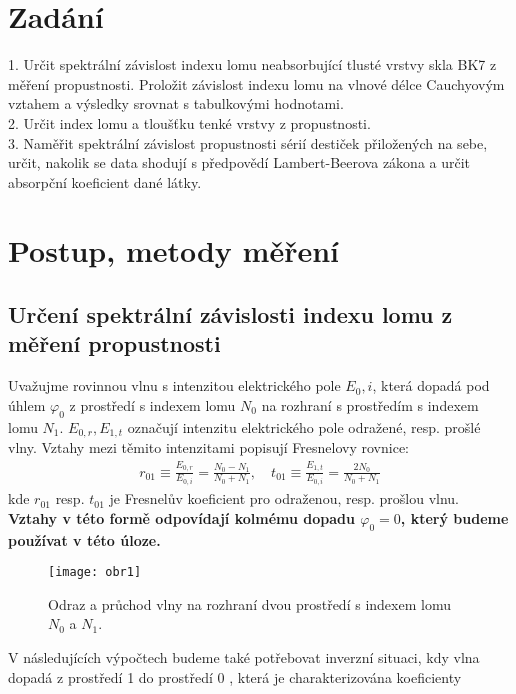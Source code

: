 \documentclass[czech,11pt,a4paper]{article}
\begin{document}
	\begin{multicols}{2}
	\section{Zadání}
	1. Určit spektrální závislost indexu lomu neabsorbující tlusté vrstvy skla BK7 z měření propustnosti. Proložit závislost indexu lomu na vlnové délce Cauchyovým vztahem a výsledky srovnat s tabulkovými hodnotami.\\
	2. Určit index lomu a tloušťku tenké vrstvy z propustnosti.\\
	3. Naměřit spektrální závislost propustnosti sérií destiček přiložených na sebe, určit, nakolik se data shodují s předpovědí Lambert-Beerova zákona a určit absorpční koeficient dané látky.
	\section{Postup, metody měření}
	\subsection{Určení spektrální závislosti indexu lomu z měření propustnosti}
	Uvažujme rovinnou vlnu s intenzitou elektrického pole $E_0,i$, která dopadá pod úhlem $\varphi_0$ z prostředí s indexem lomu $N_0$ na rozhraní s prostředím s indexem lomu $N_1$. $E_{0,r}, E_{1,t}$ označují intenzitu elektrického pole odražené, resp. prošlé vlny. Vztahy mezi těmito intenzitami popisují Fresnelovy rovnice:
	 {\small \begin{gather}
			r_{01} \equiv \frac{E_{0, r}}{E_{0, i}}=\frac{N_{0}-N_{1}}{N_{0}+N_{1}}, \quad t_{01} \equiv \frac{E_{1, t}}{E_{0, i}}=\frac{2 N_{0}}{N_{0}+N_{1}}  
	\end{gather}}
	kde $r_{01}$ resp. $t_{01}$ je Fresnelův koeficient pro odraženou, resp. prošlou vlnu.\\ \textbf{Vztahy v této formě odpovídají kolmému dopadu $\varphi_{0}=0$, který budeme používat v této úloze.} 

	\begin{figure}[H]
		\begin{center}
			
		\texttt{[image: obr1]} 
		\caption{Odraz a průchod vlny na rozhraní dvou prostředí s indexem lomu $N_{0}$ a $N_{1}$.}
		\end{center}
		
	\end{figure} 
	V následujících výpočtech budeme také potřebovat inverzní situaci, kdy vlna dopadá z prostředí 1 do prostředí 0 , která je charakterizována koeficienty
	

\end{multicols}
\end{document}
